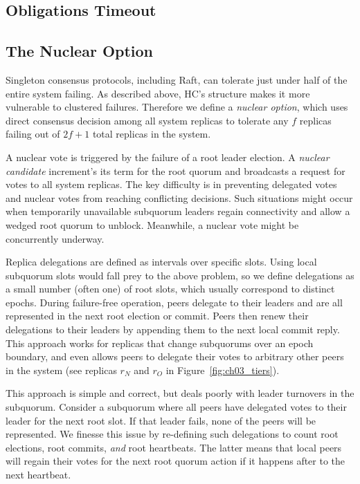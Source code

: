 \subsection{Obligations Timeout}


\subsection{The Nuclear Option}
\label{sec:nuclear}


Singleton consensus protocols, including Raft, can tolerate just under half of the entire system failing.
As described above, HC's structure makes it more vulnerable to clustered failures.
Therefore we define a \emph{nuclear option}, which uses direct consensus decision among all system replicas to tolerate any $f$ replicas failing out of $2f+1$ total replicas in the system.

A nuclear vote is triggered by the failure of a root leader election.
A \emph{nuclear candidate} increment's its term for the root quorum and broadcasts a request for votes to all system replicas.
The key difficulty is in preventing delegated votes and nuclear votes from reaching conflicting decisions.
Such situations might occur when temporarily unavailable subquorum leaders regain connectivity and allow a wedged root quorum to unblock.
Meanwhile, a nuclear vote might be concurrently underway.

Replica delegations are defined as intervals over specific slots.
Using local subquorum slots would fall prey to the above problem, so we define delegations as a small number (often one) of root slots, which usually correspond to distinct epochs.
During failure-free operation, peers delegate to their leaders and are all represented in the next root election or commit.
Peers then renew their delegations to their leaders by appending them to the next local commit reply.
This approach works for replicas that change subquorums over an epoch boundary, and even allows peers to delegate their votes to arbitrary other peers in the system (see replicas $r_N$ and $r_O$ in Figure~\ref{fig:ch03_tiers}).

This approach is simple and correct, but deals poorly with leader turnovers in the subquorum.
Consider a subquorum where all peers have delegated votes to their leader for the next root slot.
If that leader fails, none of the peers will be represented.
We finesse this issue by re-defining such delegations to count root elections, root commits, \emph{and} root heartbeats.
The latter means that local peers will regain their votes for the next root quorum action if it happens after to the next heartbeat.

